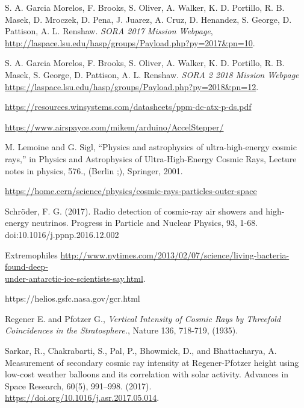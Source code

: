 \newpage

\begin{thebibliography}{9}

S. A. Garcia Morelos, F. Brooks, S. Oliver, A. Walker, K. D. Portillo, R. B. Masek, D. Mroczek, D. Pena, J. Juarez, A. Cruz, D. Henandez, S. George, D. Pattison, A. L. Renshaw. \textit{SORA 2017 Mission Webpage}, \url{http://laspace.lsu.edu/hasp/groups/Payload.php?py=2017&pn=10}.

S. A. Garcia Morelos, F. Brooks, S. Oliver, A. Walker, K. D. Portillo, R. B. Masek, S. George, D. Pattison, A. L. Renshaw. \textit{SORA 2 2018 Mission Webpage} \url{https://laspace.lsu.edu/hasp/groups/Payload.php?py=2018&pn=12}.

\url{https://resources.winsystems.com/datasheets/ppm-dc-atx-p-ds.pdf}

\url{https://www.airspayce.com/mikem/arduino/AccelStepper/}

M. Lemoine and G. Sigl, “Physics and astrophysics of ultra-high-energy cosmic rays,” in
Physics and Astrophysics of Ultra-High-Energy Cosmic Rays, Lecture notes in physics, 576.,
(Berlin ;), Springer, 2001.

\url{https://home.cern/science/physics/cosmic-rays-particles-outer-space}

  Schröder, F. G. (2017). Radio detection of cosmic-ray air showers and high-energy neutrinos. Progress in Particle and Nuclear Physics, 93, 1-68. doi:10.1016/j.ppnp.2016.12.002

  Extremophiles \href{http://www.nytimes.com/2013/02/07/science/living-bacteria-found-deep-under-antarctic-ice-scientists-say.html}{http://www.nytimes.com/2013/02/07/science/living-bacteria-found-deep-\\under-antarctic-ice-scientists-say.html}.

  https://helios.gsfc.nasa.gov/gcr.html

  Regener E. and Pfotzer G., \textit{Vertical Intensity of Cosmic Rays by Threefold Coincidences in the Stratosphere.}, Nature 136, 718-719, (1935). 

  Sarkar, R., Chakrabarti, S., Pal, P., Bhowmick, D., and Bhattacharya, A. Measurement of secondary cosmic ray intensity at Regener-Pfotzer height using low-cost weather balloons and its correlation with solar activity. Advances in Space Research, 60(5), 991–998. (2017). \url{https://doi.org/10.1016/j.asr.2017.05.014}.


\end{thebibliography}

